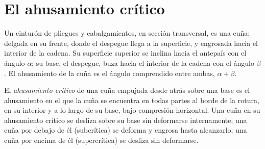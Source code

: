 \begin{omfigure}
\par{}\label{fig:b3:orogenic-wedges:duplex}
\end{omfigure}


\section{El ahusamiento crítico}\label{sec:b3:orogenic-wedges:taper}

Un cinturón de pliegues y cabalgamientos, en sección transversal, es una cuña: delgada en su frente, donde
el despegue llega a la superficie, y engrosada hacia el interior de la cadena.
Su superficie superior se inclina hacia el antepaís con el ángulo $\alpha$; su
base, el despegue, buza hacia el interior de la cadena con el ángulo $\beta$. El
ahusamiento de la cuña es el ángulo comprendido entre ambas, $\alpha + \beta$.

\begin{definition}\label{def:b3:orogenic-wedges:critical-taper}
El \emph{ahusamiento crítico} de una cuña empujada desde atrás
sobre una base es el ahusamiento en el que la cuña se encuentra en todas partes al borde de
la rotura, en su interior y a lo largo de su base, bajo compresión horizontal. Una cuña en
su ahusamiento crítico se desliza sobre su base sin deformarse internamente; una
cuña por debajo de él (subcrítica) se deforma y engrosa hasta alcanzarlo; una
cuña por encima de él (supercrítica) se desliza sin deformarse.
\end{definition}

